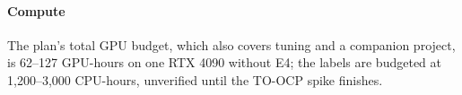 \paragraph{Compute} The plan's total GPU budget, which also covers tuning and a companion
project, is 62--127 GPU-hours on one RTX 4090 without E4; the labels are budgeted at
1,200--3,000 CPU-hours, unverified until the TO-OCP spike finishes.
